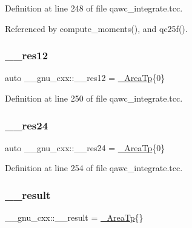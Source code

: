 Definition at line 248 of file qawc\+\_\+integrate.\+tcc.



Referenced by compute\+\_\+moments(), and qc25f().

\mbox{\label{namespace____gnu__cxx_a6ea2384a750bf3ec4778454ae3b4b5c3}} 
\subsubsection{\texorpdfstring{\+\_\+\+\_\+res12}{\_\_res12}}
{\footnotesize\ttfamily auto \+\_\+\+\_\+gnu\+\_\+cxx\+::\+\_\+\+\_\+res12 = \hyperlink{namespace____gnu__cxx_ae97a51b75e19c30f48d27fac4664de6e}{\+\_\+\+Area\+Tp}\{0\}}



Definition at line 250 of file qawc\+\_\+integrate.\+tcc.

\mbox{\label{namespace____gnu__cxx_af9fb40bd2c7cde535117200af946d670}} 
\subsubsection{\texorpdfstring{\+\_\+\+\_\+res24}{\_\_res24}}
{\footnotesize\ttfamily auto \+\_\+\+\_\+gnu\+\_\+cxx\+::\+\_\+\+\_\+res24 = \hyperlink{namespace____gnu__cxx_ae97a51b75e19c30f48d27fac4664de6e}{\+\_\+\+Area\+Tp}\{0\}}



Definition at line 254 of file qawc\+\_\+integrate.\+tcc.

\mbox{\label{namespace____gnu__cxx_a500ea9f53aeaecd8c2ae657503450578}} 
\subsubsection{\texorpdfstring{\+\_\+\+\_\+result}{\_\_result}}
{\footnotesize\ttfamily \+\_\+\+\_\+gnu\+\_\+cxx\+::\+\_\+\+\_\+result = \hyperlink{namespace____gnu__cxx_ae97a51b75e19c30f48d27fac4664de6e}{\+\_\+\+Area\+Tp}\{\}}



